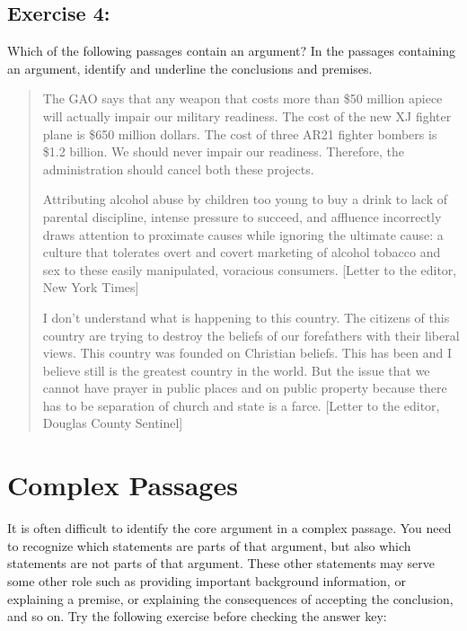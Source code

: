 \documentclass[report,oneside]{memoir}
\begin{document}
\subsection{Exercise 4:}
\label{exercise4:}

Which of the following passages contain an argument? In the passages containing an argument, identify and underline the conclusions and premises. 

\begin{quote}

The GAO says that any weapon that costs more than \$50 million apiece will actually impair our military readiness. The cost of the new XJ fighter plane is \$650 million dollars. The cost of three AR21 fighter bombers is \$1.2 billion. We should never impair our readiness. Therefore, the administration should cancel both these projects.

Attributing alcohol abuse by children too young to buy a drink to lack of parental discipline, intense pressure to succeed, and affluence incorrectly draws attention to proximate causes while ignoring the ultimate cause: a culture that tolerates overt and covert marketing of alcohol tobacco and sex to these easily manipulated, voracious consumers. [Letter to the editor, New York Times]

I don't understand what is happening to this country. The citizens of this country are trying to destroy the beliefs of our forefathers with their liberal views. This country was founded on Christian beliefs. This has been and I believe still is the greatest country in the world. But the issue that we cannot have prayer in public places and on public property because there has to be separation of church and state is a farce. [Letter to the editor, Douglas County Sentinel]
\end{quote}

\section{Complex Passages}
\label{complexpassages}

It is often difficult to identify the core argument in a complex passage. You need to recognize which statements are parts of that argument, but also which statements are not parts of that argument. These other statements may serve some other role such as providing important background information, or explaining a premise, or explaining the consequences of accepting the conclusion, and so on. Try the following exercise before checking the answer key: 
\end{document}
